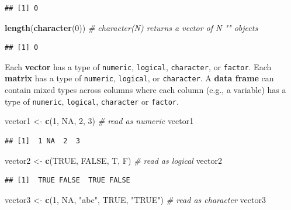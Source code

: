 \documentclass[]{book}
\newenvironment{Shaded}{\begin{snugshade}}{\end{snugshade}}
\newcommand{\KeywordTok}[1]{\textcolor[rgb]{0.13,0.29,0.53}{\textbf{{#1}}}}
\newcommand{\DecValTok}[1]{\textcolor[rgb]{0.00,0.00,0.81}{{#1}}}
\newcommand{\StringTok}[1]{\textcolor[rgb]{0.31,0.60,0.02}{{#1}}}
\newcommand{\CommentTok}[1]{\textcolor[rgb]{0.56,0.35,0.01}{\textit{{#1}}}}
\newcommand{\OtherTok}[1]{\textcolor[rgb]{0.56,0.35,0.01}{{#1}}}
\newcommand{\NormalTok}[1]{{#1}}
\theoremstyle{definition}
\theoremstyle{definition}
\theoremstyle{remark}
\begin{document}
\begin{verbatim}
## [1] 0
\end{verbatim}

\begin{Shaded}
\begin{Highlighting}[]
\KeywordTok{length}\NormalTok{(}\KeywordTok{character}\NormalTok{(}\DecValTok{0}\NormalTok{)) }\CommentTok{# character(N) returns a vector of N "" objects}
\end{Highlighting}
\end{Shaded}

\begin{verbatim}
## [1] 0
\end{verbatim}

Each \textbf{vector} has a type of \texttt{numeric}, \texttt{logical},
\texttt{character}, or \texttt{factor}. Each \textbf{matrix} has a type
of \texttt{numeric}, \texttt{logical}, or \texttt{character}. A
\textbf{data frame} can contain mixed types across columns where each
column (e.g., a variable) has a type of \texttt{numeric},
\texttt{logical}, \texttt{character} or \texttt{factor}.

\begin{Shaded}
\begin{Highlighting}[]
\NormalTok{vector1 <-}\StringTok{ }\KeywordTok{c}\NormalTok{(}\DecValTok{1}\NormalTok{, }\OtherTok{NA}\NormalTok{, }\DecValTok{2}\NormalTok{, }\DecValTok{3}\NormalTok{) }\CommentTok{# read as numeric}
\NormalTok{vector1}
\end{Highlighting}
\end{Shaded}

\begin{verbatim}
## [1]  1 NA  2  3
\end{verbatim}

\begin{Shaded}
\begin{Highlighting}[]
\NormalTok{vector2 <-}\StringTok{ }\KeywordTok{c}\NormalTok{(}\OtherTok{TRUE}\NormalTok{, }\OtherTok{FALSE}\NormalTok{, T, F) }\CommentTok{# read as logical}
\NormalTok{vector2}
\end{Highlighting}
\end{Shaded}

\begin{verbatim}
## [1]  TRUE FALSE  TRUE FALSE
\end{verbatim}

\begin{Shaded}
\begin{Highlighting}[]
\NormalTok{vector3 <-}\StringTok{ }\KeywordTok{c}\NormalTok{(}\DecValTok{1}\NormalTok{, }\OtherTok{NA}\NormalTok{, }\StringTok{"abc"}\NormalTok{, }\OtherTok{TRUE}\NormalTok{, }\StringTok{"TRUE"}\NormalTok{) }\CommentTok{# read as character}
\NormalTok{vector3}
\end{Highlighting}
\end{Shaded}
\end{document}

